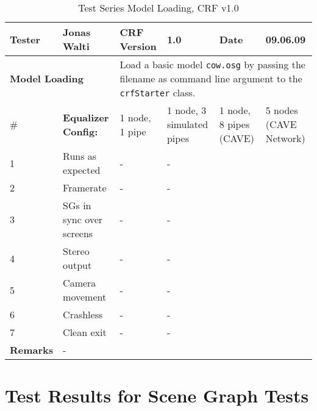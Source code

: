 \begin{table}[H]
	\centering
	\begin{tabular}{|b{}|b{}|m{}|m{}|m{}|m{}|}
		\hline
		\bfseries Tester & Jonas Walti & \bfseries CRF Version & 1.0 & \bfseries Date & 09.06.09 \\
		\hline
		\hline
		\multicolumn{2}{|l|}{\large{\bfseries Model Loading}} & \multicolumn{4}{p{0.6\textwidth}|}{Load a basic model \texttt{cow.osg} by passing the filename as command line argument to the \texttt{crfStarter} class.}\\
		\hline
		\hline
		\# & \bfseries Equalizer Config: & 1 node, 1 pipe & 1 node, 3 simulated pipes &  1 node, 8 pipes (CAVE) &  5 nodes (CAVE Network) \\
		\hline 1 & Runs as expected & \quad\quad- & \quad\quad- & \tick & \tick \\
		\hline 2 & Framerate & \quad\quad- & \quad\quad- & \quad\quad106 & \quad\quad550 \\
		\hline 3 & SGs in sync over screens & \quad\quad- & \quad\quad- & \tick & \tick \\
		\hline 4 & Stereo output & \quad\quad- & \quad\quad- & \tick & \tick\\
		\hline 5 & Camera movement & \quad\quad- & \quad\quad- & \tick & \tick\\
		\hline 6 & Crashless & \quad\quad- & \quad\quad- & \tick & \tick\\
		\hline 7 & Clean exit & \quad\quad- & \quad\quad- & \tick & \tick\\
		\hline
		\hline \bfseries Remarks & \multicolumn{5}{l|}{-}\\
		\hline
	\end{tabular}
	\caption{Test Series Model Loading, CRF v1.0}
\end{table}

\section{Test Results for Scene Graph Tests}

